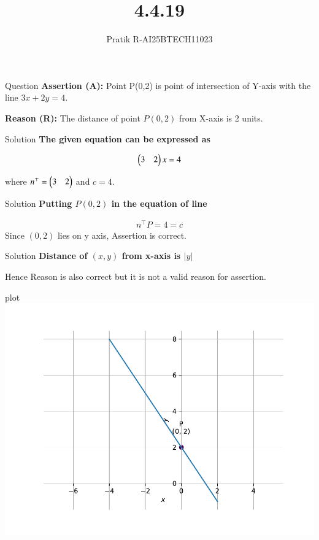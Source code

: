 \documentclass{beamer}
\title 
{4.4.19}
\author 
{Pratik R-AI25BTECH11023}
\begin{document}
\frame{\titlepage}
\begin{frame}{Question}
\textbf{Assertion (A):} Point P(0,2) is point of intersection of Y-axis with the line
$3x + 2y = 4$.

\textbf{Reason (R):} The distance of point $P(0,2)$ from X-axis is 2 units.
\end{frame}
\begin{frame}{Solution} 
\textbf{The given equation can be expressed as}

\begin{align}
    \begin{pmatrix}3 & 2\end{pmatrix}x =4
\end{align}

where $n^\top = \begin{pmatrix}3&2\end{pmatrix}$ and $c = 4$.
\end{frame}
\begin{frame}{Solution}
\textbf{Putting $P(0,2)$ in the equation of line}

\begin{align}
n^\top P =4=c
\end{align}
Since $(0,2)$ lies on y axis, Assertion is correct.
\end{frame}
\begin{frame}{Solution}
\textbf{Distance of $(x,y)$ from x-axis is $|y|$}

Hence Reason is also correct but it is not a valid reason for assertion.
\end{frame}
\begin{frame}{plot}
\centering
    \includegraphics[width=\columnwidth, height=0.8\textheight, keepaspectratio]{../figs/fig.pdf}     
\end{frame}
\end{document}
